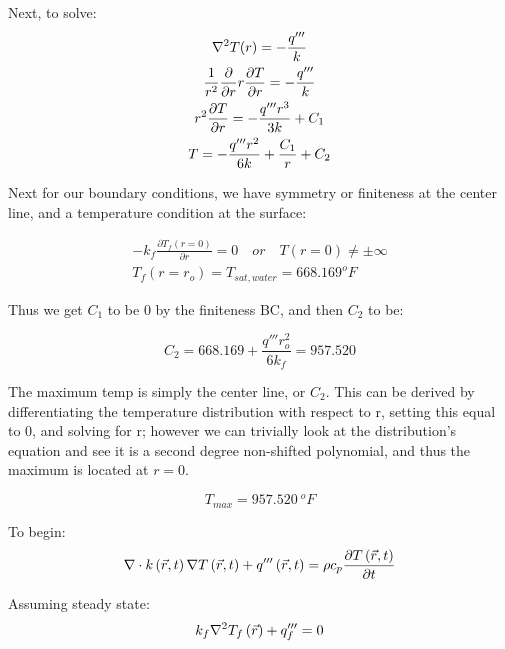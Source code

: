 \documentclass{article}
\begin{document}
Next, to solve:
\begin{equation}
    \begin{gathered}
        \nabla^2T(r) = -\frac{q'''}{k}\\
        \frac{1}{r^2}\frac{\partial }{\partial r}r\frac{\partial T}{\partial r} = -\frac{q'''}{k}\\
        r^2\frac{\partial T}{\partial r} = -\frac{q'''r^3}{3k} + C_1\\
        T = -\frac{q'''r^2}{6k} + \frac{C_1}{r} + C_2
    \end{gathered}
\end{equation}


Next for our boundary conditions, we have symmetry or finiteness at the center line, and a temperature condition at the surface:

\begin{equation}
\begin{gathered}
    -k_f \frac{\partial T_f(r = 0)}{\partial r} = 0 \quad or \quad T(r = 0) \neq \pm \infty \\
    T_f(r = r_o) = T_{sat,water} = 668.169 ^oF
\end{gathered}
\end{equation}


Thus we get $C_1$ to be 0 by the finiteness BC, and then $C_2$ to be:

\begin{equation}
    C_2 = 668.169 + \frac{q'''r_o^2}{6 k_f} = 957.520
\end{equation}

The maximum temp is simply the center line, or $C_2$. This can be derived by differentiating the temperature distribution with respect to r, setting this equal to 0, and solving for r; however we can trivially look at the distribution's equation and see it is a second degree non-shifted polynomial, and thus the maximum is located at $r=0$.

\[
\boxed{T_{max} = 957.520 \ ^oF}
\]











\newpage
{}
To begin:
\begin{equation}
    \nabla \cdot k\left(\Vec{r},t\right) \nabla T \left(\Vec{r},t\right) + q'''\left(\Vec{r},t\right) = \rho c_p \frac{\partial T \left(\Vec{r},t\right)}{\partial t}
\end{equation}

Assuming steady state:
\begin{equation}
    k_{f} \nabla^2 T_{f} \left(\Vec{r}\right) + q'''_{f} = 0
\end{equation}
\end{document}
